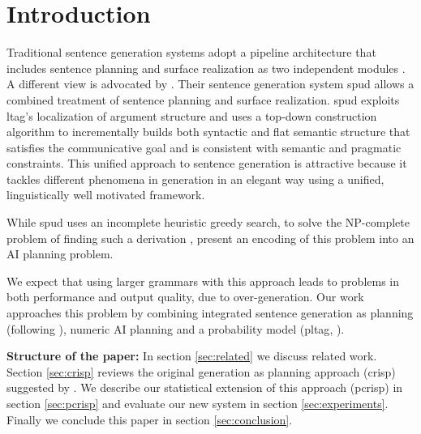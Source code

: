 \section{Introduction}
Traditional sentence generation systems adopt a pipeline architecture that includes sentence planning and surface realization as two independent modules \cite{reiterdale2000}.  A different view is advocated by . Their sentence generation system {\sc spud} allows a combined treatment of sentence planning and surface realization.
{\sc spud} exploits {\sc ltag}'s localization of argument structure and uses a top-down construction algorithm to incrementally builds both syntactic and flat semantic structure that satisfies the communicative goal and is consistent with semantic and pragmatic constraints. 
This unified approach to sentence generation is attractive because it tackles different phenomena in generation in an elegant way using a unified, linguistically well motivated framework.

While {\sc spud} uses an incomplete heuristic greedy search, to solve the {\sc NP-}complete problem of finding such a derivation \cite{kollerstriegnitz2002},  present an encoding of this problem into an AI planning problem.

We expect that using larger grammars with this approach leads to problems in both performance and output quality, due to over-generation. 
Our work approaches this problem by combining integrated sentence generation as planning (following ), numeric AI planning and a probability model ({\sc pltag}, ).

{\bf Structure of the paper:}
In section \ref{sec:related} we discuss related work. Section \ref{sec:crisp} reviews the original generation as planning approach ({\sc crisp}) suggested by . We describe our statistical extension of this approach ({\sc pcrisp}) in section \ref{sec:pcrisp} and evaluate our new system in section \ref{sec:experiments}. Finally we conclude this paper in section \ref{sec:conclusion}.  
